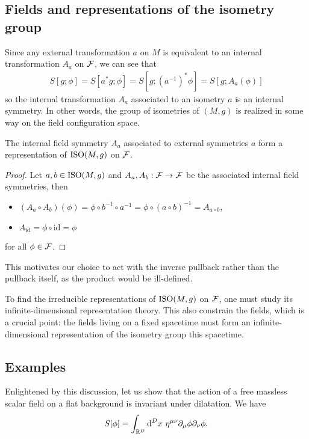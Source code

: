 \documentclass[a4paper,10pt]{article}
\begin{document}
    \subsection{Fields and representations of the isometry group}

        Since any external transformation $a$ on $M$ is equivalent to an internal transformation $A_a$ on $\mathcal{F}$, we can see that
        \begin{eqnarray}
            S[g;\phi]=S[a^*g;\phi]=S[g;(a^{-1})^*\phi]=S[g;A_a(\phi)]
        \end{eqnarray}
        so the internal transformation $A_a$ associated to an isometry $a$ is an internal symmetry. In other words, the group of isometries of $(M,g)$ is realized in some way on the field configuration space.
        \begin{prop}
            The internal field symmetry $A_a$ associated to external symmetries $a$ form a representation of $\text{ISO}(M,g)$ on $\mathcal{F}$.
        \end{prop}
        \begin{proof}
            Let $a,b\in\text{ISO}(M,g)$ and $A_a,A_b:\mathcal{F}\to\mathcal{F}$ be the associated internal field symmetries, then
            \begin{itemize}
                \item $(A_a\circ A_b)(\phi)=\phi\circ b^{-1}\circ a^{-1} = \phi\circ(a\circ b)^{-1} = A_{a\circ b}$,
                \item $A_{\text{id}} = \phi\circ\text{id}=\phi$
            \end{itemize}
            for all $\phi\in\mathcal{F}$.
        \end{proof}
        This motivates our choice to act with the inverse pullback rather than the pullback itself, as the product would be ill-defined.

        To find the irreducible representations of $\text{ISO}(M,g)$ on $\mathcal{F}$, one must study its infinite-dimensional representation theory. This also constrain the fields, which is a crucial point: the fields living on a fixed spacetime must form an infinite-dimensional representation of the isometry group this spacetime.
    
    \subsection{Examples}

        \begin{examp}
                Enlightened by this discussion, let us show that the action of a free massless scalar field on a flat background is invariant under dilatation. We have
                \begin{equation}
                    S[\phi]=\int_{\mathbb{R}^D}\text{d}^Dx~\eta^{\mu\nu}\partial_\mu\phi\partial_\nu\phi.
                \end{equation}
        \end{examp}
\end{document}
